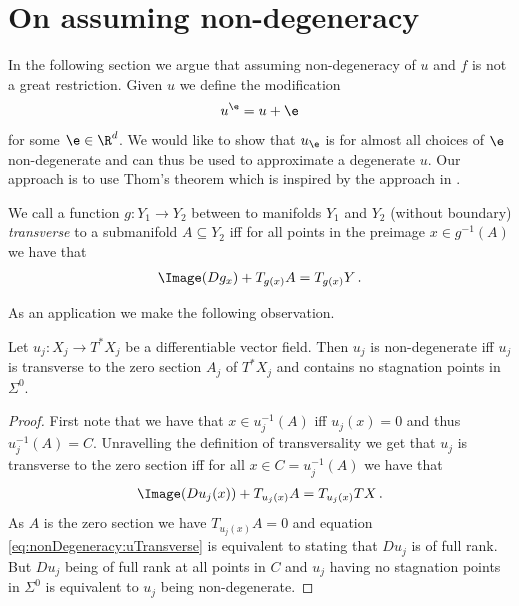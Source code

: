 \section{On assuming non-degeneracy}\label{se:assuming_nonDegeneracy}

In the following section we argue that assuming non-degeneracy 
of $u$ and $f$ is not a great restriction.
Given $u$ we define the modification
\begin{align}
  u^\e=u+\e\label{eq:nonDegeneracy:definitionUEps}
\end{align}
for some $\e\in\R^d$. We would like to show that $u_\e$ is for almost all choices of $\e$ non-degenerate and can 
thus be used to approximate a degenerate $u$.
Our approach is to use Thom's theorem which is inspired by the approach in \cite[Chapter 6]{Hirsch1994}.
\begin{definition}[Transversality]
  We call a function $g\colon Y_1\to Y_2$ between to manifolds $Y_1$ and $Y_2$ (without boundary)
  \emph{transverse} to a submanifold $A\subseteq Y_2$ iff for all points in the 
  preimage $x\in g^{-1}(A)$ we have that
  \begin{align*}
    \Image(Dg_x)+T_{g(x)}A = T_{g(x)}Y\,.
  \end{align*}
\end{definition}
As an application we make the following observation.
\begin{proposition}\label{pr:nonDegeneracy:alternativeCharacterisation}
  Let $u_j\colon X_j\to T^*X_j$ be a differentiable vector field.
  Then $u_j$ is non-degenerate iff $u_j$ is transverse to the zero section $A_j$ of $T^*X_j$
  and contains no stagnation points in $\Sigma^0$.
\end{proposition}
\begin{proof}
  First note that we have that $x\in u_j^{-1}(A)$ iff $u_j(x)=0$ and thus $u_j^{-1}(A)=C$.
  Unravelling the definition of transversality we get that $u_j$ is transverse to the zero section iff for all $x\in C=u_j^{-1}(A)$
  we have that
  \begin{align}
    \Image(Du_j(x))+T_{u_j(x)}A = T_{u_j(x)}TX\,. \label{eq:nonDegeneracy:uTransverse}
  \end{align}
  As $A$ is the zero section we have $T_{u_j(x)}A=0$ and equation \eqref{eq:nonDegeneracy:uTransverse}
  is equivalent to stating that $Du_j$ is of full rank. But $Du_j$ being of full rank at all points
  in $C$ and $u_j$ having no stagnation points in $\Sigma^0$ is equivalent to $u_j$ being non-degenerate.
\end{proof}
